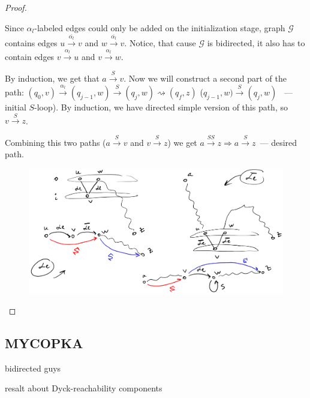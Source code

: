 \begin{proof}
\begin{itemize}
        Since $\alpha_l$-labeled edges could only be added on the initialization stage, 
        graph $\mathcal{G}$ contains edges $u \xrightarrow{\overline{\alpha_l}} v$ and $w \xrightarrow{\overline{\alpha_l}} v$. Notice, that cause $\mathcal{G}$ is bidirected, it also has to contain edges $v \xrightarrow{\alpha_l} u$ and $v \xrightarrow{\alpha_l} w$.

        By induction, we get that $a \xrightarrow{S} v$. Now we will construct a second part of the path: $(q_0, v) \xrightarrow{\alpha_l} (q_{j-1}, w) \xrightarrow{S} (q_j, w) \rightsquigarrow (q_f, z)$ ($q_{j-1}, w) \xrightarrow{S} (q_j, w)$ ~--- initial $S$-loop). By induction, we have directed simple version of this path, so $v \xrightarrow{S} z$. 

        Combining this two paths ($a \xrightarrow{S} v$ and $v \xrightarrow{S} z$) we get $a \xrightarrow{SS} z \Rightarrow a \xrightarrow{S} z$~--- desired path.
        
    \begin{figure}[H]
        \includegraphics[width=\linewidth]{img/th_proof_img.png}
    \end{figure}
\end{itemize}

\end{proof}


\subsection{MYCOPKA}

bidirected guys \cite{10.1145/2491956.2462159}

resalt about Dyck-reachability components \cite{10.1145/2499370.2462159}